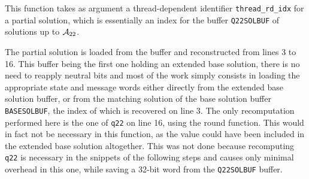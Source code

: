 \medskip

This function takes as argument a thread-dependent identifier \texttt{thread_rd_idx} for a partial solution, which is essentially an index for the buffer \texttt{Q22SOLBUF}
of solutions up to $\mathcal{A}_{22}$.

The partial solution is loaded from the buffer and reconstructed from lines 3 to 16. This buffer being the first one holding an extended base solution,
there is no need to reapply neutral bits and most of the work simply consists in loading the appropriate state and message words either directly from the extended base solution
buffer, or from the matching solution of the base solution buffer \texttt{BASESOLBUF}, the index of which is recovered on line 3. The only recomputation performed here
is the one of \texttt{q22} on line 16, using the \shaone round function. This would in fact not be necessary in this function, as the value could have been included in the extended base solution altogether.
This was not done because recomputing \texttt{q22} is necessary in the snippets of the following steps and causes only minimal overhead in this one, while saving a 32-bit word from the \texttt{Q22SOLBUF} buffer.

